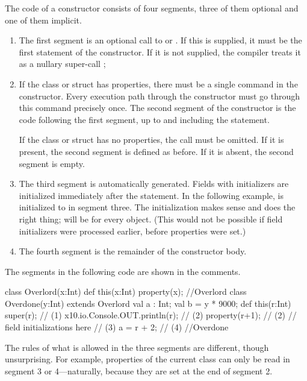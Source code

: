 The code of a constructor consists of four segments, three of them optional
and one of them implicit.
\begin{enumerate}
\item The first segment is an optional call to  or
      .  If this is supplied, it must be the first statement
      of the constructor.  If it is not supplied, the compiler treats it as a
      nullary super-call ;
\item If the class or struct has properties, there must be a single
       command in the constructor.  Every execution path
      through the constructor must go through this  command
      precisely once.   The second segment of the constructor is the code
      following the first segment, up to and including the 
      statement.

      If the class or struct has no properties, the  call must
      be omitted. If it is present, the second segment is defined as before.  If
      it is absent, the second segment is empty.
\item The third segment is automatically generated.  Fields with initializers
      are initialized immediately after the  statement.
      In the following example,  is initialized to  in
      segment three.  The initialization makes sense and does the right
      thing;  will be  for every  object.
      (This would not be possible if field initializers were processed
      earlier, before properties were set.)
\item The fourth segment is the remainder of the constructor body.
\end{enumerate}

The segments in the following code are shown in the comments.
\begin{xten}
class Overlord(x:Int) {
  def this(x:Int) { property(x); }
}//Overlord
class Overdone(y:Int) extends Overlord  {
  val a : Int;
  val b =  y * 9000;
  def this(r:Int) {
    super(r);                      // (1)
    x10.io.Console.OUT.println(r); // (2)
    property(r+1);                 // (2)
    // field initializations here  // (3)
    a = r + 2;                     // (4)
  }
}//Overdone
\end{xten}
%

The rules of what is allowed in the three segments are different, though
unsurprising.  For example, properties of the current class can only be read
in segment 3 or 4---naturally, because they are set at the end of segment 2.

